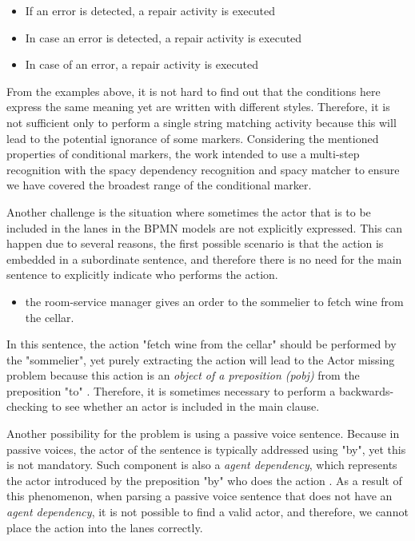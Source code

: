 \begin{itemize}
	\item If an error is detected, a repair activity is executed
	\item In case an error is detected, a repair activity is executed
	\item In case of an error, a repair activity is executed
\end{itemize}

From the examples above, it is not hard to find out that the conditions here express the same meaning yet are written with different styles. Therefore, it is not sufficient only to perform a single string matching activity because this will lead to the potential ignorance of some markers. Considering the mentioned properties of conditional markers, the work intended to use a multi-step recognition with the spacy dependency recognition and spacy matcher to ensure we have covered the broadest range of the conditional marker. 

Another challenge is the situation where sometimes the actor that is to be included in the lanes in the BPMN models are not explicitly expressed. This can happen due to several reasons, the first possible scenario is that the action is embedded in a subordinate sentence, and therefore there is no need for the main sentence to explicitly indicate who performs the action.

\begin{itemize}
	\item the room-service manager gives an order to the sommelier to fetch wine from the cellar.
\end{itemize}

In this sentence, the action "fetch wine from the cellar" should be performed by the "sommelier", yet purely extracting the action will lead to the Actor missing problem because this action is an \textit{object of a preposition (pobj)} from the preposition "to" \cite{dependencies_manual}. Therefore, it is sometimes necessary to perform a backwards-checking to see whether an actor is included in the main clause. 

Another possibility for the problem is using a passive voice sentence. Because in passive voices, the actor of the sentence is typically addressed using "by", yet this is not mandatory. Such component is also a \textit{agent dependency}, which represents the actor introduced by the preposition "by" who does the action \cite{dependencies_manual}. As a result of this phenomenon, when parsing a passive voice sentence that does not have an \textit{agent dependency}, it is not possible to find a valid actor, and therefore, we cannot place the action into the lanes correctly.

